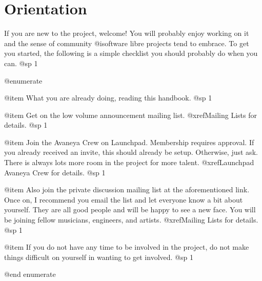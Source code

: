 \section{Orientation}

If you are new to the project, welcome! You will probably enjoy working on it and the sense of community @i{software libre} projects tend to embrace. To get you started, the following is a simple checklist you should probably do when you can.
@sp 1

@enumerate

@item
What you are already doing, reading this handbook.
@sp 1

@item
Get on the low volume announcement mailing list. @xref{Mailing Lists} for details.
@sp 1

@item
Join the Avaneya Crew on Launchpad. Membership requires approval. If you already received an invite, this should already be setup. Otherwise, just ask. There is always lots more room in the project for more talent. @xref{Launchpad Avaneya Crew} for details.
@sp 1

@item
Also join the private discussion mailing list at the aforementioned link. Once on, I recommend you email the list and let everyone know a bit about yourself. They are all good people and will be happy to see a new face. You will be joining fellow musicians, engineers, and artists. @xref{Mailing Lists} for details.
@sp 1

@item
If you do not have any time to be involved in the project, do not make things difficult on yourself in wanting to get involved.
@sp 1

@end enumerate

